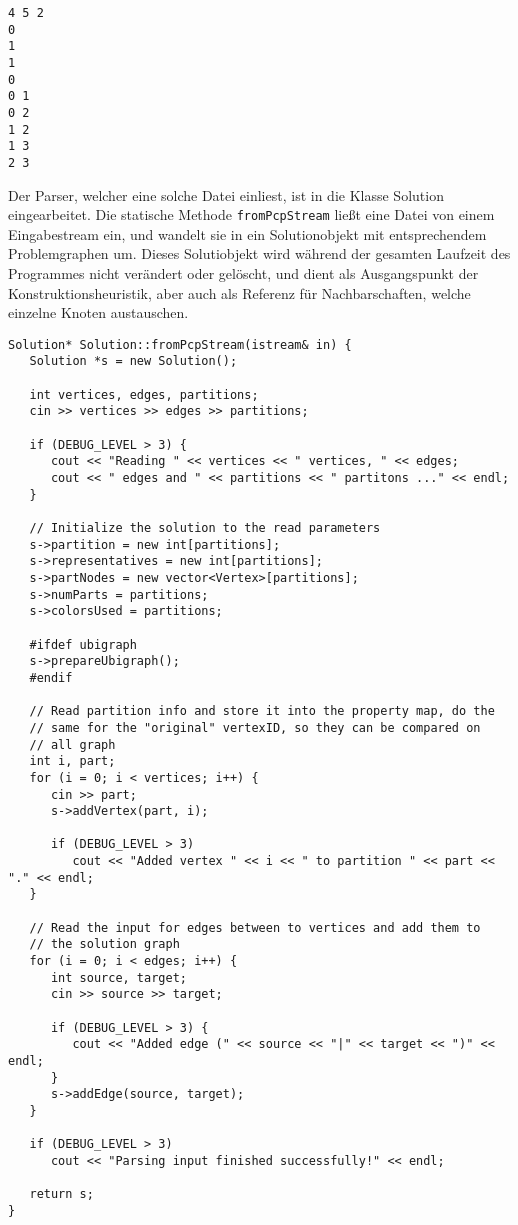 \singlespacing
\begin{lstlisting}[caption={Eine einfache \textit{.pcp}-Beispieldatei},label={lst:pcp}]
4 5 2
0
1
1
0
0 1
0 2
1 2
1 3
2 3
\end{lstlisting}

Der Parser, welcher eine solche Datei einliest, ist in die Klasse Solution eingearbeitet. Die statische Methode \texttt{fromPcpStream} ließt eine
Datei von einem Eingabestream ein, und wandelt sie in ein Solutionobjekt mit entsprechendem Problemgraphen um. Dieses Solutiobjekt wird während
der gesamten Laufzeit des Programmes nicht verändert oder gelöscht, und dient als Ausgangspunkt der Konstruktionsheuristik, aber auch als
Referenz für Nachbarschaften, welche einzelne Knoten austauschen.

\singlespacing
\begin{lstlisting}[caption={Die Methode \texttt{fromPcpStream}, welche eine Datei im \texttt{.pcp}-Format einließt und in ein Solutionobjekt umwandelt},label={lst:frompcp}]
Solution* Solution::fromPcpStream(istream& in) {
   Solution *s = new Solution();
   
   int vertices, edges, partitions;
   cin >> vertices >> edges >> partitions;
   
   if (DEBUG_LEVEL > 3) {
      cout << "Reading " << vertices << " vertices, " << edges;
      cout << " edges and " << partitions << " partitons ..." << endl;
   }
   
   // Initialize the solution to the read parameters
   s->partition = new int[partitions];
   s->representatives = new int[partitions];
   s->partNodes = new vector<Vertex>[partitions];
   s->numParts = partitions;
   s->colorsUsed = partitions;
   
   #ifdef ubigraph
   s->prepareUbigraph();
   #endif

   // Read partition info and store it into the property map, do the 
   // same for the "original" vertexID, so they can be compared on 
   // all graph
   int i, part;
   for (i = 0; i < vertices; i++) {
      cin >> part;
      s->addVertex(part, i);
      
      if (DEBUG_LEVEL > 3)
         cout << "Added vertex " << i << " to partition " << part << "." << endl;
   }

   // Read the input for edges between to vertices and add them to 
   // the solution graph
   for (i = 0; i < edges; i++) {
      int source, target;
      cin >> source >> target;

      if (DEBUG_LEVEL > 3) {
         cout << "Added edge (" << source << "|" << target << ")" << endl;
      }
      s->addEdge(source, target);
   }
   
   if (DEBUG_LEVEL > 3)
      cout << "Parsing input finished successfully!" << endl;

   return s;
}
\end{lstlisting}


